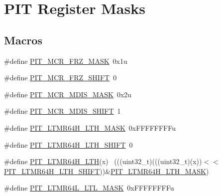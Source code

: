 \hypertarget{group___p_i_t___register___masks}{}\section{P\+IT Register Masks}
\label{group___p_i_t___register___masks}
\subsection*{Macros}
\begin{DoxyCompactItemize}
\item 
\#define \hyperlink{group___p_i_t___register___masks_ga8149a0bb21843632dd4528b540480ba7}{P\+I\+T\+\_\+\+M\+C\+R\+\_\+\+F\+R\+Z\+\_\+\+M\+A\+SK}~0x1u
\item 
\#define \hyperlink{group___p_i_t___register___masks_ga500ccd29eaebc20aa853e7bbb23e3c0c}{P\+I\+T\+\_\+\+M\+C\+R\+\_\+\+F\+R\+Z\+\_\+\+S\+H\+I\+FT}~0
\item 
\#define \hyperlink{group___p_i_t___register___masks_ga024258b2c23ff75f3e161e56adbbe733}{P\+I\+T\+\_\+\+M\+C\+R\+\_\+\+M\+D\+I\+S\+\_\+\+M\+A\+SK}~0x2u
\item 
\#define \hyperlink{group___p_i_t___register___masks_ga7ddcd16550ff71e4ee5ac48022ae6fb6}{P\+I\+T\+\_\+\+M\+C\+R\+\_\+\+M\+D\+I\+S\+\_\+\+S\+H\+I\+FT}~1
\item 
\#define \hyperlink{group___p_i_t___register___masks_ga2f52ce484f53348d406fae4b3cac7fdf}{P\+I\+T\+\_\+\+L\+T\+M\+R64\+H\+\_\+\+L\+T\+H\+\_\+\+M\+A\+SK}~0x\+F\+F\+F\+F\+F\+F\+F\+Fu
\item 
\#define \hyperlink{group___p_i_t___register___masks_gaf355862db7eafd261031477364a6ef8d}{P\+I\+T\+\_\+\+L\+T\+M\+R64\+H\+\_\+\+L\+T\+H\+\_\+\+S\+H\+I\+FT}~0
\item 
\#define \hyperlink{group___p_i_t___register___masks_ga3eb34b6683a77fcd8b280fa41e513cb2}{P\+I\+T\+\_\+\+L\+T\+M\+R64\+H\+\_\+\+L\+TH}(x)                                          ~(((uint32\+\_\+t)(((uint32\+\_\+t)(x))$<$$<$\hyperlink{group___p_i_t___register___masks_gaf355862db7eafd261031477364a6ef8d}{P\+I\+T\+\_\+\+L\+T\+M\+R64\+H\+\_\+\+L\+T\+H\+\_\+\+S\+H\+I\+FT}))\&\hyperlink{group___p_i_t___register___masks_ga2f52ce484f53348d406fae4b3cac7fdf}{P\+I\+T\+\_\+\+L\+T\+M\+R64\+H\+\_\+\+L\+T\+H\+\_\+\+M\+A\+SK})
\item 
\#define \hyperlink{group___p_i_t___register___masks_gab7337206a85c605ed0ea16b77df99e1a}{P\+I\+T\+\_\+\+L\+T\+M\+R64\+L\+\_\+\+L\+T\+L\+\_\+\+M\+A\+SK}~0x\+F\+F\+F\+F\+F\+F\+F\+Fu
\item 
$$
\end{DoxyCompactItemize}
